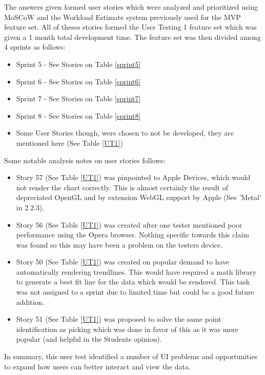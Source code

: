 The answers given formed user stories which were analyzed and prioritized using MoSCoW and the Workload Estimate system previously used for the MVP feature set. All of theses stories formed the User Testing 1 feature set which was given a 1 month total development time. The feature set was then divided among 4 sprints as follows:

\begin{itemize}
    \item Sprint 5 - See Stories on Table \ref{sprint5}
    \item Sprint 6 - See Stories on Table \ref{sprint6}
    \item Sprint 7 - See Stories on Table \ref{sprint7}
    \item Sprint 8 - See Stories on Table \ref{sprint8}
    \item Some User Stories though, were chosen to not be developed, they are mentioned here (See Table \ref{UT1})
\end{itemize}

Some notable analysis notes on user stories follows:

\begin{itemize}
    \item Story 57 (See Table \ref{UT1}) was pinpointed to Apple Devices, which would not render the chart correctly. This is almost certainly the result of depreciated OpenGL and by extension WebGL support by Apple (See 'Metal' in 2.2.3).
    \item Story 56 (See Table \ref{UT1}) was created after one tester mentioned poor performance using the Opera browser. Nothing specific towards this claim was found so this may have been a problem on the testers device.
    \item Story 50 (See Table \ref{UT1}) was created on popular demand to have automatically rendering trendlines. This would have required a math library to generate a best fit line for the data which would be rendered. This task was not assigned to a sprint due to limited time but could be a good future addition.
    \item Story 51 (See Table \ref{UT1}) was proposed to solve the same point identification as picking which was done in favor of this as it was more popular (and helpful in the Students opinion).
\end{itemize}

In summary, this user test identified a number of UI problems and opportunities to expand how users can better interact and view the data.

